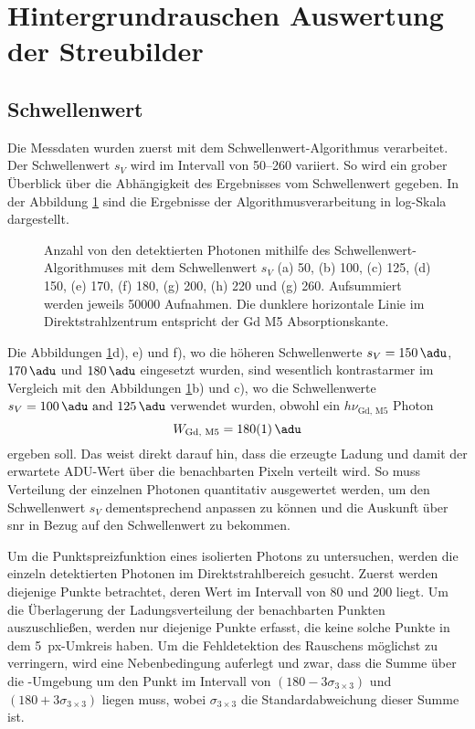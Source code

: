 \section{Hintergrundrauschen Auswertung der Streubilder}
\label{text:streuung_counting}
\subsection{Schwellenwert}
Die Messdaten wurden zuerst mit dem Schwellenwert-Algorithmus verarbeitet. Der Schwellenwert $s_V$ wird im Intervall von \SIrange{50}{260}{\adu} variiert. So wird ein grober Überblick über die Abhängigkeit des Ergebnisses vom Schwellenwert gegeben. In der Abbildung \ref{fig:th_50_100_125_150_170_180_200_220_260} sind die Ergebnisse der Algorithmusverarbeitung in log-Skala dargestellt.
\begin{figure}[H]
    \centering
    
    \caption{Anzahl von den detektierten Photonen mithilfe des Schwellenwert-Algorithmuses mit dem Schwellenwert $s_V$ (a) \SI{50}{\adu}, (b) \SI{100}{\adu}, (c) \SI{125}{\adu}, (d) \SI{150}{\adu}, (e) \SI{170}{\adu}, (f) \SI{180}{\adu}, (g) \SI{200}{\adu}, (h) \SI{220}{\adu} und (g) \SI{260}{\adu}. Aufsummiert werden jeweils \num{50000} Aufnahmen. Die dunklere horizontale Linie im Direktstrahlzentrum entspricht der Gd M5 Absorptionskante.}
    \label{fig:th_50_100_125_150_170_180_200_220_260}
\end{figure}
\noindent
Die Abbildungen \ref{fig:th_50_100_125_150_170_180_200_220_260}d), e) und f), wo die höheren Schwellenwerte $s_V = \SI{150}{\adu}$, $\SI{170}{\adu}$ und $\SI{180}{\adu}$ eingesetzt wurden, sind wesentlich kontrastarmer im Vergleich mit den Abbildungen \ref{fig:th_50_100_125_150_170_180_200_220_260}b) und c), wo die Schwellenwerte $s_V = \qtylist{100;125}{\adu}$ verwendet wurden, obwohl ein $h\nu_\text{Gd, M5}$ Photon
 \begin{equation}
    W_\text{Gd, M5} = \SI{180(1)}{\adu}
\end{equation}
ergeben soll. Das weist direkt darauf hin, dass die erzeugte Ladung und damit der erwartete ADU-Wert über die benachbarten Pixeln verteilt wird. So muss Verteilung der einzelnen Photonen quantitativ ausgewertet werden, um den Schwellenwert $s_V$ dementsprechend anpassen zu können und die Auskunft über \gls{snr} in Bezug auf den Schwellenwert zu bekommen.

\noindent
Um die Punktspreizfunktion eines isolierten Photons zu untersuchen, werden die einzeln detektierten Photonen im  Direktstrahlbereich gesucht. Zuerst werden diejenige Punkte betrachtet, deren Wert im Intervall von \SI{80}{\adu} und \SI{200}{\adu} liegt. Um die Überlagerung der Ladungsverteilung der benachbarten Punkten auszuschließen, werden nur diejenige Punkte erfasst, die keine solche Punkte in dem \SI{5}{px}-Umkreis haben. Um die Fehldetektion des Rauschens möglichst zu verringern, wird eine Nebenbedingung auferlegt und zwar, dass die Summe über die -Umgebung um den Punkt im Intervall von $(180-3\sigma_{3\times 3})$ \si{\adu} und $(180+3\sigma_{3\times 3})$ \si{\adu} liegen muss, wobei $\sigma_{3\times 3}$ die Standardabweichung dieser Summe ist.

